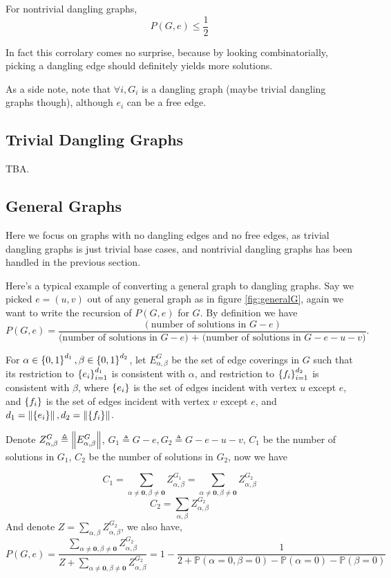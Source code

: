 \begin{Cor}
	For nontrivial dangling graphs,
	\[P(G, e) \leq \frac{1}{2}\]
\end{Cor}

In fact this corrolary comes no surprise, because by looking combinatorially, picking a dangling edge should definitely yields more solutions.

As a side note, note that $\forall i, G_i$ is a dangling graph (maybe trivial dangling graphs though), although $e_i$ can be a free edge.


\subsection{Trivial Dangling Graphs}
TBA.

\subsection{General Graphs}
Here we focus on graphs with no dangling edges and no free edges, as trivial dangling graphs is just trivial base cases, and nontrivial dangling graphs has been handled in the previous section.

Here's a typical example of converting a general graph to dangling graphs.
Say we picked $e=(u,v)$ out of any general graph as in figure \ref{fig:generalG}, again we want to write the recursion of $P(G,e)$ for $G$.
By definition we have 
\begin{equation}
	P(G,e) = \frac{(\textrm{number of solutions in $G-e$})}{\textrm{(number of solutions in $G-e$) + (number of solutions in $G-e-u-v$)}}.
\end{equation}


	For $\alpha \in \left\{0,1\right\}^{d_1}, \beta \in \left\{0,1\right\}^{d_2}$, let $E_{\alpha,\beta}^G$ be the set of edge coverings in $G$ such that its restriction to $\left\{e_i\right\}_{i=1}^{d_1}$ is consistent with $\alpha$, and restriction to $\left\{f_i\right\}_{i=1}^{d_2}$ is consistent with $\beta$,  where $\left\{e_i\right\}$ is the set of edges incident with vertex $u$ except $e$, and $\left\{f_i\right\}$ is the set of edges incident with vertex $v$ except $e$, and $d_1 = \left\Vert\left\{e_i\right\}\right\Vert, d_2 = \left\Vert\left\{f_i\right\}\right\Vert$.

	Denote $Z_{\alpha, \beta}^G \triangleq \left\Vert E_{\alpha, \beta}^G\right\Vert$, $G_1 \triangleq G-e, G_2 \triangleq G-e-u-v$, $C_1$ be the number of solutions in $G_1$, $C_2$ be the number of solutions in $G_2$, now we have
\begin{Prop}
\[C_1 = \sum_{\alpha \neq \mathbf{0}, \beta \neq \mathbf{0}} Z_{\alpha, \beta}^{G_1} = \sum_{\alpha \neq \mathbf{0}, \beta \neq \mathbf{0}} Z_{\alpha, \beta}^{G_2}\]
\[C_2 = \sum_{\alpha , \beta} Z_{\alpha, \beta}^{G_2}\]
And denote $Z = \sum_{\alpha , \beta} Z_{\alpha, \beta}^{G_2}$, we also have,
\[P(G,e) = \frac{\sum_{\alpha \neq \mathbf{0}, \beta \neq \mathbf{0}} Z_{\alpha, \beta}^{G_2}}{Z + \sum_{\alpha \neq \mathbf{0}, \beta \neq \mathbf{0}} Z_{\alpha, \beta}^{G_2}} = 1 - \frac{1}{2 + \mathbb{P}\left( \alpha = 0, \beta = 0 \right) - \mathbb{P} \left( \alpha = 0 \right) - \mathbb{P} \left( \beta = 0 \right)}\]
\end{Prop}


